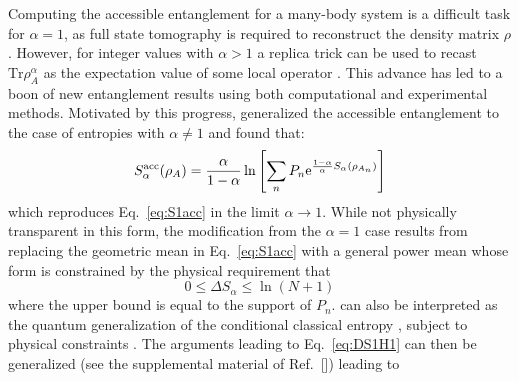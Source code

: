 Computing the accessible entanglement for a many-body system is a difficult task for $\alpha=1$, as full state tomography is required to reconstruct the density matrix $\rho$. However, for integer values with $\alpha > 1$ a replica trick can be used to recast $\mathrm{Tr} \rho_A^\alpha$ as the expectation value of some local operator \cite{Calabrese:2004hl}. This advance has led to a boon of new entanglement results using both computational \cite{Hastings:2010dc, Humeniuk:2012cq, McMinis:2013dp, Herdman:2014ey, Drut:2015fs} and experimental \cite{Daley:2012bd, Islam:2015cm, Kaufman:2016ep, Pichler:2016ec, Linke:2017tf, Lukin:2018wg} methods.  Motivated by this progress, \cite{PhysRevLett.121.150501} generalized the accessible entanglement to the case of \ren entropies with $\alpha \ne 1$ and found that:
%
\begin{equation}
S_{\alpha}^{{\rm acc}} (\rho_A) = \frac{\alpha}{1-\alpha}\ln\left[ \sum_{n} P_n \mathrm{e}^{\frac{1-\alpha}{\alpha} S_{\alpha}(\rho_{A_n})}\right]
\label{eq:S_alpha_acc}
\end{equation} 
%
which reproduces Eq.~\eqref{eq:S1acc} in the limit $\alpha \to 1$. While not physically transparent in this form, the modification from the $\alpha=1$ case results from replacing the geometric mean in Eq.~\eqref{eq:S1acc} with a general power mean whose form is constrained by the physical requirement that
%
\begin{equation}
 0 \le \Delta S_\alpha \le \ln (N+1)
\label{eq:DeltaS_alpha_inq}
\end{equation}
%
where the upper bound is equal to the support of $P_n$.  can also be interpreted as the quantum generalization of the conditional classical \ren entropy \cite{Cachin97entropymeasures,GolshaniPashaYari:2009,Hayashi:2011,SKORIC:2011el,FehrBerens2014}, subject to physical constraints \cite{Barghathi:2018oe}. The arguments leading to Eq.~\eqref{eq:DS1H1} can then be generalized (see the supplemental material of Ref.~[\cite{Barghathi:2018oe}]) leading to 
